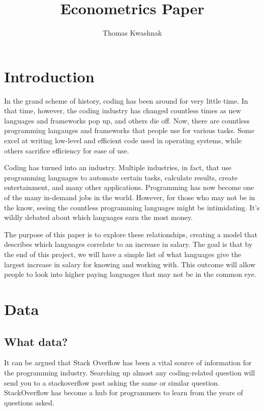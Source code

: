\documentclass{report}
\title{Econometrics Paper}
\author{Thomas Kwashnak}
\begin{document}
\maketitle

\tableofcontents

\newpage

\chapter{Introduction}
In the grand scheme of history, coding has been around for very little time. In that time, however, the coding industry has changed countless times as new languages and frameworks pop up, and others die off. Now, there are countless programming langauges and frameworks that people use for various tasks. Some excel at writing low-level and efficient code used in operating systems, while others sacrifice efficiency for ease of use.

Coding has turned into an industry. Multiple industries, in fact, that use programming languages to automate certain tasks, calculate results, create entertainment, and many other applications. Programming has now become one of the many in-demand jobs in the world. However, for those who may not be in the know, seeing the countless programming languages might be intimidating. It's wildly debated about which languages earn the most money.

The purpose of this paper is to explore these relationships, creating a model that describes which languages correlate to an increase in salary. The goal is that by the end of this project, we will have a simple list of what languages give the largest increase in salary for knowing and working with. This outcome will allow people to look into higher paying languages that may not be in the common eye.

\chapter{Data}

\section{What data?}

It can be argued that Stack Overflow has been a vital source of information for the programming industry. Searching up almost any coding-related question will send you to a stackoverflow post asking the same or similar question. StackOverflow has become a hub for programmers to learn from the years of questions asked.
\end{document}
